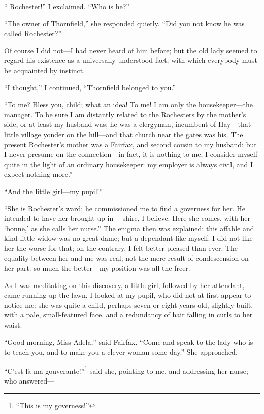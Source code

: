 \enquote{\Mr{} Rochester!} I exclaimed. \enquote{Who is he?}

\enquote{The owner of Thornfield,} she responded quietly. \enquote{Did
	you not know he was called Rochester?}

Of course I did not---I had never heard of him before; but the old lady
seemed to regard his existence as a universally understood fact, with
which everybody must be acquainted by instinct.

\enquote{I thought,} I continued, \enquote{Thornfield belonged to you.}

\enquote{To me? Bless you, child; what an idea! To me! I am only the
	housekeeper---the manager. To be sure I am distantly related to the
	Rochesters by the mother's side, or at least my husband was; he was a
	clergyman, incumbent of Hay---that little village yonder on the
	hill---and that church near the gates was his. The present \Mr{}
	Rochester's mother was a Fairfax, and second cousin to my husband: but I
	never presume on the connection---in fact, it is nothing to me; I
	consider myself quite in the light of an ordinary housekeeper: my
	employer is always civil, and I expect nothing more.}

\enquote{And the little girl---my pupil!}

\enquote{She is \Mr{} Rochester's ward; he commissioned me to find a
	governess for her. He intended to have her brought up in ---shire, I
	believe. Here she comes, with her \foreignquote{french}{bonne,} as she calls her
	nurse.} The enigma then was explained: this affable and kind little
widow was no great dame; but a dependant like myself. I did not like
her the worse for that; on the contrary, I felt better pleased than
ever. The equality between her and me was real; not the mere result of
condescension on her part: so much the better---my position was all the
freer.

As I was meditating on this discovery, a little girl, followed by her
attendant, came running up the lawn. I looked at my pupil, who did not
at first appear to notice me: she was quite a child, perhaps seven or
eight years old, slightly built, with a pale, small-featured face, and a
redundancy of hair falling in curls to her waist.

\enquote{Good morning, Miss Adela,} said \Mrs{} Fairfax. \enquote{Come
	and speak to the lady who is to teach you, and to make you a clever
	woman some day.} She approached.

\foreignquote{french}{C'est là ma gouverante!}\footnote{\enquote{This is my governess!}} said she, pointing to me, and
addressing her nurse; who answered---

